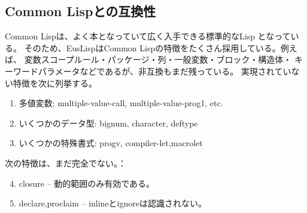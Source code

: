 \subsection{Common Lispとの互換性}

Common Lispは、よく本となっていて広く入手できる標準的なLisp\cite{CLtL,CLtL2}
となっている。
そのため、EusLispはCommon Lispの特徴をたくさん採用している。例えば、
変数スコープルール・パッケージ・列・一般変数・ブロック・構造体・
キーワードパラメータなどであるが、非互換もまだ残っている。
実現されていない特徴を次に列挙する。

\begin{enumerate}
\item 多値変数:
      multiple-value-call, multiple-value-prog1, etc.
\item いくつかのデータ型:
      bignum, character, deftype
\item いくつかの特殊書式:
      progv, compiler-let,macrolet
\end{enumerate}

次の特徴は、まだ完全でない。：
\begin{enumerate}
\setcounter{enumi}{3}
\item  closure -- 動的範囲のみ有効である。
\item  declare,proclaim -- inlineとignoreは認識されない。
\end{enumerate}

